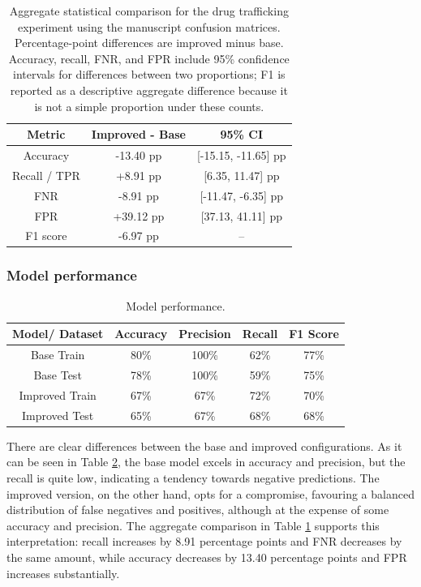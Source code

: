 \documentclass[fleqn,10pt]{wlscirep}
\begin{document}
\begin{table}[!htb]
\centering
\begin{tabular}{|c|c|c|}
\hline
\textbf{Metric} & \textbf{Improved - Base} & \textbf{95\% CI} \\ \hline
Accuracy & -13.40 pp & [-15.15, -11.65] pp \\ 
Recall / TPR & +8.91 pp & [6.35, 11.47] pp \\ 
FNR & -8.91 pp & [-11.47, -6.35] pp \\ 
FPR & +39.12 pp & [37.13, 41.11] pp \\ 
F1 score & -6.97 pp & -- \\ \hline
\end{tabular}
\caption{Aggregate statistical comparison for the drug trafficking experiment using the manuscript confusion matrices. Percentage-point differences are improved minus base. Accuracy, recall, FNR, and FPR include 95\% confidence intervals for differences between two proportions; F1 is reported as a descriptive aggregate difference because it is not a simple proportion under these counts.}
\label{tab:dt_statistical_tests}
\end{table}

\subsubsection{Model performance}

\begin{table}[!htb]
\centering
\begin{tabular}{|c|c|c|c|c|}
\hline

\textbf{Model/ Dataset} & \textbf{Accuracy} & \textbf{Precision} & \textbf{Recall} & \textbf{F1 Score} \\ \hline
     Base Train &     80\% &     100\% &   62\% &     77\% \\
      Base Test &     78\% &     100\% &   59\% &     75\% \\
Improved Train &     67\% &      67\% &   72\% &     70\% \\
 Improved Test &     65\% &      67\% &   68\% &     68\% \\

\hline
\end{tabular}
\caption{Model performance.}
\label{tab_perf_tdrogas:}
\end{table}


There are clear differences between the base and improved configurations. As it can be seen in Table \ref{tab_perf_tdrogas:}, the base model excels in accuracy and precision, but the recall is quite low, indicating a tendency towards negative predictions. The improved version, on the other hand, opts for a compromise, favouring a balanced distribution of false negatives and positives, although at the expense of some accuracy and precision. The aggregate comparison in Table \ref{tab:dt_statistical_tests} supports this interpretation: recall increases by 8.91 percentage points and FNR decreases by the same amount, while accuracy decreases by 13.40 percentage points and FPR increases substantially.
\end{document}
